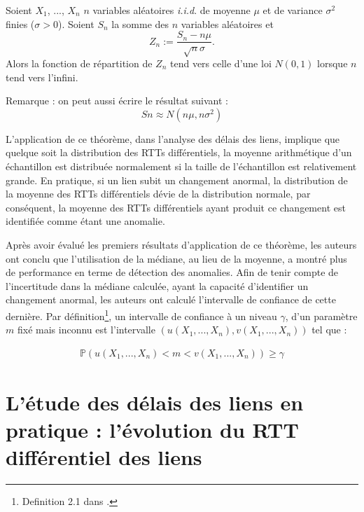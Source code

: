 \begin{tcolorbox}
	Soient $X_1$, ..., $X_n$ $n$ variables aléatoires \textit{i.i.d}. de moyenne $\mu$ et de variance $\sigma^2$ finies ($\sigma > 0$). Soient $S_n$ la somme des $n$ variables aléatoires et 
	\begin{equation}
	Z_n := \frac{S_n - n\mu}{\sqrt{n} \sigma}.
	\end{equation} 
	Alors la fonction de répartition de $Z_n$ tend vers celle d'une loi $N(0,1)$ lorsque $n$ tend vers l'infini.
	
	Remarque : on peut aussi écrire le résultat suivant :
	\begin{equation}
	Sn \approx N(n\mu, n\sigma^2)
	\end{equation}
\end{tcolorbox}

L'application de ce théorème, dans  l'analyse des délais des liens, implique que quelque soit la distribution des RTTs différentiels, la moyenne arithmétique d'un échantillon  est distribuée normalement si la taille de l'échantillon est relativement grande. En pratique,
si un lien subit un changement anormal, la distribution de la moyenne des RTTs différentiels dévie de la distribution normale, par conséquent, la moyenne des RTTs différentiels ayant produit ce changement est identifiée comme  étant une anomalie.

Après avoir évalué les premiers résultats d'application de ce théorème, les auteurs ont conclu que l'utilisation de la médiane,  au lieu de la moyenne, a montré plus de performance en terme de détection des anomalies.
Afin de tenir compte de l'incertitude dans la médiane calculée, ayant la capacité d'identifier un changement anormal, les auteurs ont  calculé  l'intervalle de confiance de cette dernière.
Par définition\footnote{Definition 2.1 dans \cite{leboudec2010performance}.},  un intervalle de confiance à un niveau $\gamma$,  d'un paramètre $m$ fixé mais inconnu est l'intervalle  $(u(X_1,...,X_n),v(X_1,...,X_n)) $ tel que  :

\begin{align}
\mathbb{P}(u(X_1,...,X_n)< m< v(X_1,...,X_n)) \geq \gamma
\end{align}

\section{L'étude des délais des liens en pratique : l'évolution du RTT différentiel des liens}

